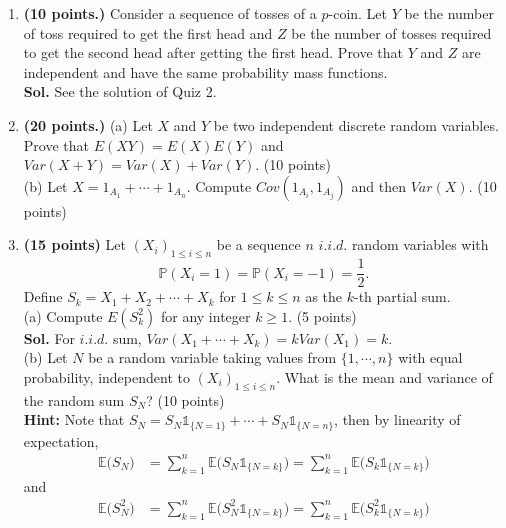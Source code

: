 \begin{enumerate}
    \item \textbf{(10 points.)}
    Consider a sequence of tosses of a $p$-coin.
    Let $Y$ be the number of toss required to get the first head and $Z$ be the number of tosses required to get the second head after getting the first head.
    Prove that $Y$ and $Z$ are independent and have the same probability mass functions.\\
    \textbf{Sol.} See the solution of Quiz 2.

    \item \textbf{(20 points.)}
    (a) Let $X$ and $Y$ be two independent discrete random variables. Prove that $E(XY)=E(X)E(Y)$ and $Var(X+Y)=Var(X)+Var(Y)$. (10 points)\\
    (b) Let $X=1_{A_{1}}+\cdots + 1_{A_{n}}$. Compute $Cov(1_{A_{i}},1_{A_{j}})$ and then $Var(X)$. (10 points)

    \item \textbf{(15 points)}
    Let $(X_i)_{1\leq i\leq n}$ be a sequence $n$ $i.i.d.$ random variables with
\begin{equation*}
\mathbb{P}(X_i=1)=\mathbb{P}(X_i=-1)=\frac{1}{2}.
\end{equation*}
Define $S_k=X_1+X_2+\cdots+X_k$ for $1\leq k\leq n$ as the $k$-th partial sum.\\
(a) Compute $E(S_{k}^{2})$ for any integer $k\ge 1$. (5 points)\\
\textbf{Sol.} For $i.i.d.$ sum, $Var(X_1+\cdots+X_k)=kVar(X_1)=k$.
\\
(b) Let $N$ be a random variable taking values from $\{1,\cdots,n\}$ with equal probability, independent to $(X_i)_{1\leq i\leq n}$. What is the mean  and variance of the random sum $S_{N}$?  (10 points) \\
\textbf{Hint:} Note that $S_N=S_N\mathds{1}_{\{N=1\}}+\cdots+S_N\mathds{1}_{\{N=n\}}$, then by linearity of expectation,
\begin{equation*}
\begin{aligned}
\mathbb{E}\big(S_N\big) &= \sum_{k=1}^n\mathbb{E}\big(S_N \mathds{1}_{\{N=k\}}\big)=\sum_{k=1}^n\mathbb{E}\big(S_k \mathds{1}_{\{N=k\}}\big)
\end{aligned}
\end{equation*}
and
\begin{equation*}
\begin{aligned}
\mathbb{E}\big(S_N^2\big) &= \sum_{k=1}^n\mathbb{E}\big(S_N^2\mathds{1}_{\{N=k\}}\big)=\sum_{k=1}^n\mathbb{E}\big(S_k^2\mathds{1}_{\{N=k\}}\big)
\end{aligned}
\end{equation*}

\end{enumerate}


